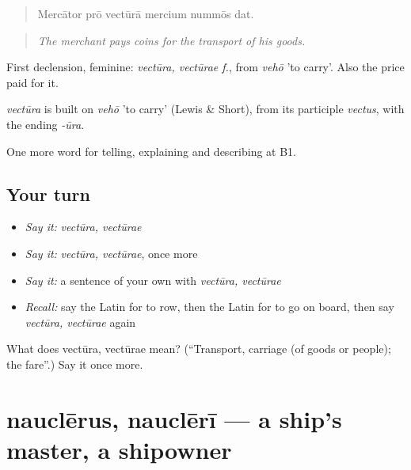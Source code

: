 \begin{quote}
Mercātor prō vectūrā mercium nummōs dat.
\end{quote}

\begin{quote}
\emph{The merchant pays coins for the transport of his goods.}
\end{quote}

First declension, feminine: \emph{vectūra, vectūrae f.}, from \emph{vehō} 'to carry'. Also the price paid for it.

\begin{cousinweb}
\emph{vectūra} is built on \emph{vehō} 'to carry' (Lewis \& Short), from its participle \emph{vectus}, with the ending \emph{-ūra}.
\end{cousinweb}

\begin{grammarlens}[title={What you've built}]
One more word for telling, explaining and describing at B1.
\end{grammarlens}

\subsection*{Your turn}
\begin{itemize}
\raggedright
  \item \emph{Say it:} \emph{vectūra, vectūrae}
  \item \emph{Say it:} \emph{vectūra, vectūrae}, once more
  \item \emph{Say it:} a sentence of your own with \emph{vectūra, vectūrae}
  \item \emph{Recall:} say the Latin for to row, then the Latin for to go on board, then say \emph{vectūra, vectūrae} again
\end{itemize}

\begin{tcolorbox}[breakable,colback=teal!4,colframe=teal!35!black,title={Before you move on}]
What does vectūra, vectūrae mean? (\textquotedblleft{}Transport, carriage (of goods or people); the fare\textquotedblright{}.) Say it once more.
\end{tcolorbox}
\section[nauclērus, nauclērī]{nauclērus, nauclērī — a ship's master, a shipowner}

\label{lesson:LA-C438-nauclerus}



